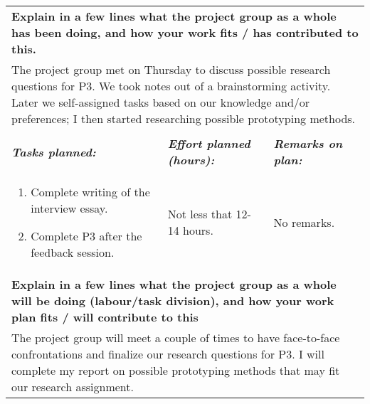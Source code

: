 \documentclass[a4paper]{article}
\begin{document}
\begin{center}
\begin{tabular}{ | p{6cm} | p{6cm} | p{6cm} | p{6cm} | }
    \hline
    \multicolumn{4}{|p{24cm}|}{\textbf{Explain in a few lines what the project
    group as a whole has been doing, and how your work fits / has contributed
    to this.}} \\
    \multicolumn{4}{|p{24cm}|}{The project group met on Thursday to discuss
    possible research questions for P3. We took notes out of a brainstorming
    activity. Later we self-assigned tasks based on our knowledge and/or
    preferences; I then started researching possible prototyping methods.} \\
    \hline
    \rowcolor{yellow!25}\multicolumn{4}{|p{24cm}|}{\textbf{Plan for the
    upcoming week:}} \\
    \hline
    \textbf{\textit{Tasks planned:}} &
    \textbf{\textit{Effort planned (hours):}} &
    \multicolumn{2}{|p{12cm}|}{\textbf{\textit{Remarks on plan:}}} \\
    \begin{enumerate}
      \vspace{-6mm}
      \item Complete writing of the interview essay.
      \item Complete P3 after the feedback session.
    \end{enumerate} &
    Not less that 12-14 hours. &
    \multicolumn{2}{|p{12cm}|}{No remarks.} \\
    \hline
    \multicolumn{4}{|p{24cm}|}{\textbf{Explain in a few lines what the project
    group as a whole will be doing (labour/task division), and how  your work
    plan fits / will contribute to this}} \\
    \multicolumn{4}{|p{24cm}|}{The project group will meet a couple of times to
    have face-to-face confrontations and finalize our research questions for
    P3. I will complete my report on possible prototyping methods that may fit
    our research assignment.} \\
    \hline
  \end{tabular}
  \egroup
\end{center}
\end{document}
